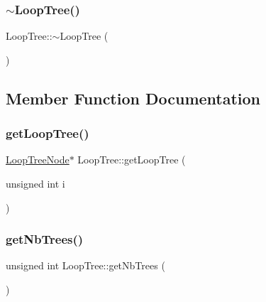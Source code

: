\mbox{\label{classLoopTree_ac7a3306c81d41d6cea849992f3fec9ce}} 
\subsubsection{\texorpdfstring{$\sim$\+Loop\+Tree()}{~LoopTree()}}
{\footnotesize\ttfamily Loop\+Tree\+::$\sim$\+Loop\+Tree (\begin{DoxyParamCaption}{ }\end{DoxyParamCaption})}



\subsection{Member Function Documentation}
\mbox{\label{classLoopTree_a1f6d82fd0d862324a8c6e042350f4209}} 
\subsubsection{\texorpdfstring{get\+Loop\+Tree()}{getLoopTree()}}
{\footnotesize\ttfamily \hyperlink{classLoopTreeNode}{Loop\+Tree\+Node}$\ast$ Loop\+Tree\+::get\+Loop\+Tree (\begin{DoxyParamCaption}\item[{unsigned int}]{i }\end{DoxyParamCaption})\hspace{0.3cm}{\ttfamily [inline]}}

\mbox{\label{classLoopTree_a16abfb41144829dfe1467d4eb407d69b}} 
\subsubsection{\texorpdfstring{get\+Nb\+Trees()}{getNbTrees()}}
{\footnotesize\ttfamily unsigned int Loop\+Tree\+::get\+Nb\+Trees (\begin{DoxyParamCaption}{ }\end{DoxyParamCaption})\hspace{0.3cm}{\ttfamily [inline]}}

